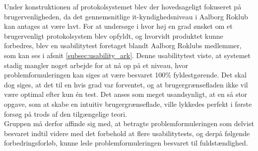 Under konstruktionen af protokolsystemet blev der hovedsageligt fokuseret på brugervenligheden, da det gennemsnitlige it-kyndighedsniveau i Aalborg Roklub kan antages at være lavt. For at undersøge i hvor høj en grad ønsket om et brugervenligt protokolsystem blev opfyldt, og hvorvidt produktet kunne forbedres, blev en usabilitytest foretaget blandt Aalborg Roklubs medlemmer, som kan ses i afsnit \ref{subsec:usability_ark}. Denne usabilitytest viste, at systemet stadig mangler noget arbejde for at nå op på et niveau, hvor problemformuleringen kan siges at være besvaret 100\% fyldestgørende. Det skal dog siges, at det til en hvis grad var forventet, og at brugergrænsefladen ikke vil være optimal efter kun én test. Det anses som meget usandsynligt, at en så stor opgave, som at skabe en intuitiv brugergrænseflade, ville lykkedes perfekt i første forsøg på trods af den tilgængelige teori. \\

Gruppen må derfor affinde sig med, at betragte problemformuleringen som delvist besvaret indtil videre med det forbehold at flere usabilitytests, og derpå følgende forbedringsforløb, kunne lede problemformuleringen besvaret til fuldstændighed.
